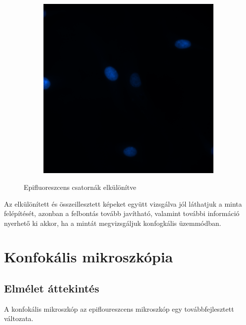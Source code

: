 \documentclass[12pt, a4paper]{article}
\begin{document}
\begin{figure}[H]
\begin{subfigure}{0.32\textwidth}
\end{subfigure}
\begin{subfigure}{0.32\textwidth}
\includegraphics[width=\textwidth]{./Confocal/kEpi.png}
\end{subfigure}
\caption{Epifluoreszcens csatornák elkülönítve}
\end{figure}
Az elkülönített és összeillesztett képeket együtt vizsgálva jól láthatjuk a minta felépítését, azonban a felbontás tovább javítható, valamint további információ nyerhető ki akkor, ha a mintát megvizsgáljuk konfogkális üzemmódban.
\section{Konfokális mikroszkópia}
\subsection{Elmélet áttekintés}
A konfokális mikroszkóp az epifloureszcens mikroszkóp egy továbbfejlesztett változata.
\end{document}
